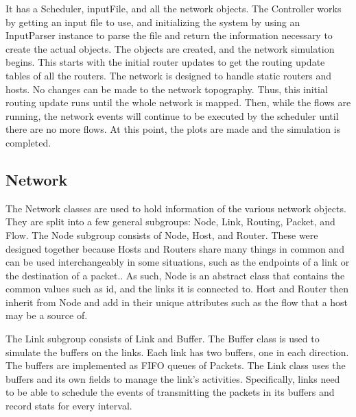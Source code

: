 \documentclass{article}
\begin{document}
It has a Scheduler, inputFile, and all the network objects. The Controller works by getting an input file to use, and initializing the system by using an InputParser instance to parse the file and return the information necessary to create the actual objects. The objects are created, and the network simulation begins. This starts with the initial router updates to get the routing update tables of all the routers. The network is designed to handle static routers and hosts. No changes can be made to the network topography. Thus, this initial routing update runs until the whole network is mapped. Then, while the flows are running, the network events will continue to be executed by the scheduler until there are no more flows. At this point, the plots are made and the simulation is completed.


\subsection{Network}

    The Network classes are used to hold information of the various network objects. They are split into a few general subgroups: Node, Link, Routing, Packet, and Flow.
The Node subgroup consists of Node, Host, and Router. These were designed together because Hosts and Routers share many things in common and can be used interchangeably in some situations, such as the endpoints of a link or the destination of a packet.. As such, Node is an abstract class that contains the common values such as id, and the links it is connected to. Host and Router then inherit from Node and add in their unique attributes such as the flow that a host may be a source of.

    The Link subgroup consists of Link and Buffer. The Buffer class is used to simulate the buffers on the links. Each link has two buffers, one in each direction. The buffers are implemented as FIFO queues of Packets. The Link class uses the buffers and its own fields to manage the link’s activities. Specifically, links need to be able to schedule the events of transmitting the packets in its buffers and record stats for every interval.
\end{document}
